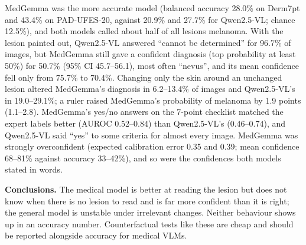 MedGemma was the more accurate model (balanced accuracy 28.0\% on Derm7pt and 43.4\% on PAD-UFES-20, against 20.9\% and 27.7\% for Qwen2.5-VL; chance 12.5\%), and both models called about half of all lesions melanoma. With the lesion painted out, Qwen2.5-VL answered ``cannot be determined'' for 96.7\% of images, but MedGemma still gave a confident diagnosis (top probability at least 50\%) for 50.7\% (95\% CI 45.7--56.1), most often ``nevus'', and its mean confidence fell only from 75.7\% to 70.4\%. Changing only the skin around an unchanged lesion altered MedGemma's diagnosis in 6.2--13.4\% of images and Qwen2.5-VL's in 19.0--29.1\%; a ruler raised MedGemma's probability of melanoma by 1.9 points (1.1--2.8). MedGemma's yes/no answers on the 7-point checklist matched the expert labels better (AUROC 0.52--0.84) than Qwen2.5-VL's (0.46--0.74), and Qwen2.5-VL said ``yes'' to some criteria for almost every image. MedGemma was strongly overconfident (expected calibration error 0.35 and 0.39; mean confidence 68--81\% against accuracy 33--42\%), and so were the confidences both models stated in words.

\textbf{Conclusions.} The medical model is better at reading the lesion but does not know when there is no lesion to read and is far more confident than it is right; the general model is unstable under irrelevant changes. Neither behaviour shows up in an accuracy number. Counterfactual tests like these are cheap and should be reported alongside accuracy for medical VLMs.
